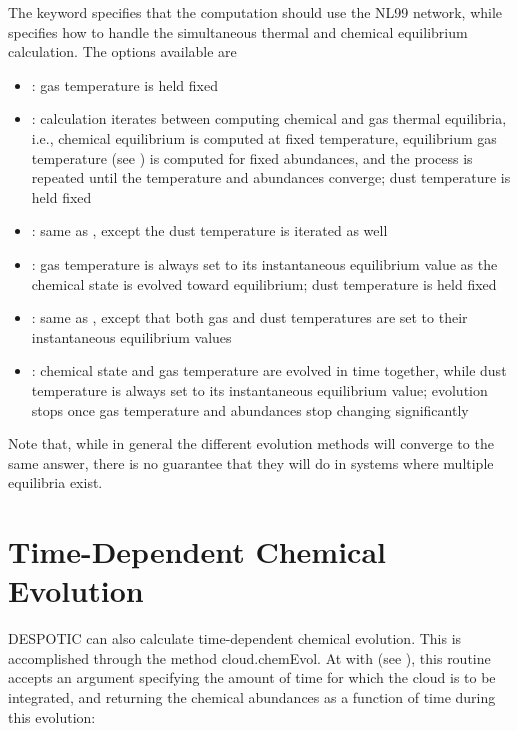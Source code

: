 \documentclass[letterpaper,10pt,english]{sphinxmanual}
\begin{document}
The  keyword specifies that the computation should use the
NL99 network, while  specifies how to handle the
simultaneous thermal and chemical equilibrium calculation. The options
available are
\begin{itemize}
\item {} 
: gas temperature is held fixed

\item {} 
: calculation iterates between computing chemical and
gas thermal equilibria, i.e., chemical equilibrium is computed at
fixed temperature, equilibrium gas temperature (see
{\hyperref[functions:ssec\string-temp\string-eq]{}}) is computed for fixed abundances, and the
process is repeated until the temperature and abundances converge;
dust temperature is held fixed

\item {} 
: same as , except the dust temperature is
iterated as well

\item {} 
: gas temperature is always set to its instantaneous
equilibrium value as the chemical state is evolved toward
equilibrium; dust temperature is held fixed

\item {} 
: same as , except that both gas and dust
temperatures are set to their instantaneous equilibrium values

\item {} 
: chemical state and gas temperature are evolved in time
together, while dust temperature is always set to its instantaneous
equilibrium value; evolution stops once gas temperature and
abundances stop changing significantly

\end{itemize}

Note that, while in general the different evolution methods will
converge to the same answer, there is no guarantee that they will do
in systems where multiple equilibria exist.


\section{Time-Dependent Chemical Evolution}
\label{functions:ssec-chem-time}\label{functions:time-dependent-chemical-evolution}
DESPOTIC can also calculate time-dependent chemical evolution. This is
accomplished through the method cloud.chemEvol. At with
 (see {\hyperref[functions:ssec\string-temp\string-evol]{}}), this routine accepts
an argument specifying the amount of time for which the cloud is to be
integrated, and returning the chemical abundances as a function of
time during this evolution:
\end{document}
